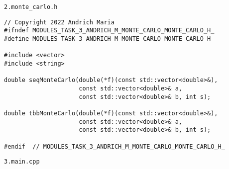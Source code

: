 \documentclass{report}
\begin{document}
\par \verb|2.monte_carlo.h|
\begin{lstlisting}
// Copyright 2022 Andrich Maria
#ifndef MODULES_TASK_3_ANDRICH_M_MONTE_CARLO_MONTE_CARLO_H_
#define MODULES_TASK_3_ANDRICH_M_MONTE_CARLO_MONTE_CARLO_H_

#include <vector>
#include <string>

double seqMonteCarlo(double(*f)(const std::vector<double>&),
                     const std::vector<double>& a,
                     const std::vector<double>& b, int s);

double tbbMonteCarlo(double(*f)(const std::vector<double>&),
                     const std::vector<double>& a,
                     const std::vector<double>& b, int s);

#endif  // MODULES_TASK_3_ANDRICH_M_MONTE_CARLO_MONTE_CARLO_H_
\end{lstlisting}
\par \verb|3.main.cpp|
\end{document}
